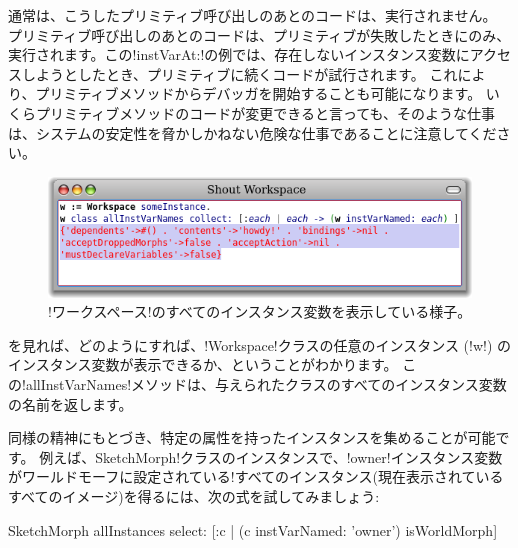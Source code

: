 \documentclass[a4paper,10pt,twoside]{book}
\begin{document}
通常は、こうしたプリミティブ呼び出しのあとのコードは、実行されません。
プリミティブ呼び出しのあとのコードは、プリミティブが失敗したときにのみ、実行されます。この\ct!instVarAt:!の例では、存在しないインスタンス変数にアクセスしようとしたとき、プリミティブに続くコードが試行されます。
これにより、プリミティブメソッドからデバッガを開始することも可能になります。
いくらプリミティブメソッドのコードが変更できると言っても、そのような仕事は、\pharo システムの安定性を脅かしかねない危険な仕事であることに注意してください。%

\begin{figure}[ht]\centering
	\includegraphics[width=\linewidth]{allInstanceVariables}
	\caption{\ct!ワークスペース!のすべてのインスタンス変数を表示している様子。}
\end{figure}

を見れば、どのようにすれば、\ct!Workspace!クラスの任意のインスタンス (\ct!w!) のインスタンス変数が表示できるか、ということがわかります。
この\ct!allInstVarNames!メソッドは、与えられたクラスのすべてのインスタンス変数の名前を返します。

同様の精神にもとづき、特定の属性を持ったインスタンスを集めることが可能です。%
例えば、SketchMorph!クラスのインスタンスで、\ct!owner!インスタンス変数がワールドモーフに設定されている\ct!すべてのインスタンス(\ie 現在表示されているすべてのイメージ)を得るには、次の式を試してみましょう:
\begin{code}{}
SketchMorph allInstances select: [:c | (c instVarNamed: 'owner') isWorldMorph]
\end{code}
\end{document}
